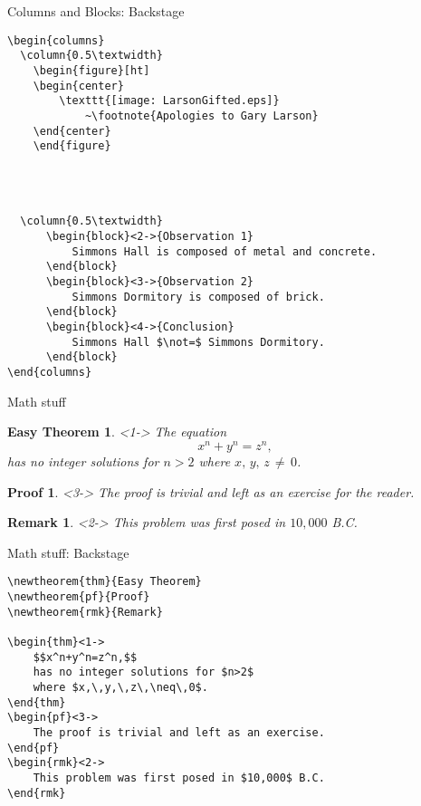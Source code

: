 \documentclass[pdf]{beamer}
\begin{document}
\begin{frame}[fragile, allowframebreaks=0.8]{Columns and Blocks: Backstage}
\begin{verbatim}
\begin{columns}
  \column{0.5\textwidth}
    \begin{figure}[ht]
    \begin{center}
        \texttt{[image: LarsonGifted.eps]}
            ~\footnote{Apologies to Gary Larson}
    \end{center}
    \end{figure}
  



  \column{0.5\textwidth}
      \begin{block}<2->{Observation 1}
          Simmons Hall is composed of metal and concrete.
      \end{block}
      \begin{block}<3->{Observation 2}
          Simmons Dormitory is composed of brick.
      \end{block}
      \begin{block}<4->{Conclusion}
          Simmons Hall $\not=$ Simmons Dormitory.
      \end{block}
\end{columns}
\end{verbatim}
\end{frame}

\newtheorem{thm}{Easy Theorem}
\newtheorem{pf}{Proof}
\newtheorem{rmk}{Remark}
\begin{frame}{Math stuff}
	\begin{thm}<1->
	The equation
	$$x^n+y^n=z^n,$$
	has no integer solutions for $n>2$ where $x,\,y,\,z\,\neq\,0$.
	\end{thm}
	\begin{pf}<3->
	The proof is trivial and left as an exercise for the reader.
	\end{pf}
	\begin{rmk}<2->
	This problem was first posed in $10,000$ B.C.
	\end{rmk}
\end{frame}

\begin{frame}[fragile]{Math stuff: Backstage}
\begin{small}
\begin{verbatim}
\newtheorem{thm}{Easy Theorem}
\newtheorem{pf}{Proof}
\newtheorem{rmk}{Remark}

\begin{thm}<1->
    $$x^n+y^n=z^n,$$
    has no integer solutions for $n>2$ 
    where $x,\,y,\,z\,\neq\,0$.
\end{thm}
\begin{pf}<3->
    The proof is trivial and left as an exercise.
\end{pf}
\begin{rmk}<2->
    This problem was first posed in $10,000$ B.C.
\end{rmk}
\end{verbatim}
\end{small}
\end{frame}
\end{document}
